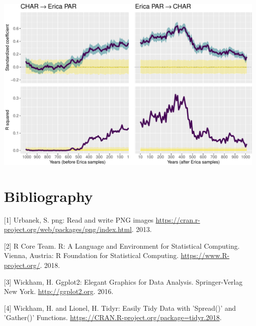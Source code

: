 \documentclass[
]{article}
\let\origfigure\figure
\let\endorigfigure\endfigure
\renewenvironment{figure}[1][2] {
    \expandafter\origfigure\expandafter[H]
} {
    \endorigfigure
}
\begin{document}
\begin{figure}
\centering
\includegraphics{Workflow_files/figure-latex/unnamed-chunk-14-1.pdf}
\caption{Results of the time-lagged models. Left panel represents models
fitted with Equation 1, that is, the influence of antecedent values of
CHAR on the pollen abundance of Erica (PAR) across time-lags up to 1000
years. The right panel represents the influence of antecedent values of
Erica PAR on CHAR over the same time-lags. Yellow strips represent
standardized coefficients and R-squared values for the null model. Data
not intersecting yellow strips is interpreted as statistically
significant.}
\end{figure}

\newpage

\hypertarget{bibliography}{%
\section{Bibliography}\label{bibliography}}

{[}1{]} Urbanek, S. png: Read and write PNG images
\url{https://cran.r-project.org/web/packages/png/index.html}. 2013.

{[}2{]} R Core Team. R: A Language and Environment for Statistical
Computing. Vienna, Austria: R Foundation for Statistical Computing.
\url{https://www.R-project.org/}. 2018.

{[}3{]} Wickham, H. Ggplot2: Elegant Graphics for Data Analysis.
Springer-Verlag New York. \url{http://ggplot2.org}. 2016.

{[}4{]} Wickham, H. and Lionel, H. Tidyr: Easily Tidy Data with
'Spread()' and 'Gather()' Functions.
\url{https://CRAN.R-project.org/package=tidyr.2018}.
\end{document}
